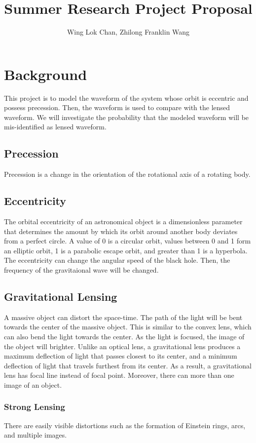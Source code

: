 \documentclass[10pt,a4paper]{article}
\author{Wing Lok Chan, Zhilong Franklin Wang}
\title{Summer Research Project Proposal}
\begin{document}
\maketitle
\newpage
\section{Background}
This project is to model the waveform of the system whose orbit is eccentric and possess precession. Then, the waveform is used to compare with the lensed waveform. We will investigate the probability that the modeled waveform will be mis-identified as lensed waveform.
\subsection{Precession}
Precession is a change in the orientation of the rotational axis of a rotating body.
\subsection{Eccentricity}
The orbital eccentricity of an astronomical object is a dimensionless parameter that determines the amount by which its orbit around another body deviates from a perfect circle. A value of 0 is a circular orbit, values between 0 and 1 form an elliptic orbit, 1 is a parabolic escape orbit, and greater than 1 is a hyperbola.\\
The eccentricity can change the angular speed of the black hole. Then, the frequency of the gravitaional wave will be changed.
\subsection{Gravitational Lensing}
A massive object can distort the space-time. The path of the light will be bent towards the center of the massive object. This is similar to the convex lens, which can also bend the light towards the center. As the light is focused, the image of the object will brighter. Unlike an optical lens, a gravitational lens produces a maximum deflection of light that passes closest to its center, and a minimum deflection of light that travels furthest from its center. As a result, a gravitational lens has focal line instead of focal point. Moreover, there can more than one image of an object.
\subsubsection{Strong Lensing}
There are easily visible distortions such as the formation of Einstein rings, arcs, and multiple images.
\end{document}
